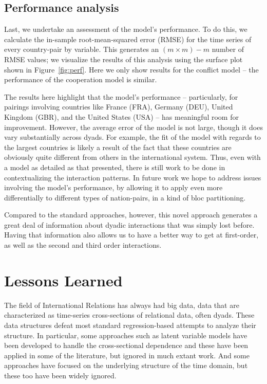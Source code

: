 \documentclass[3p,times,twocolumn,authoryear,12pt]{elsarticle}
\begin{document}
\subsection{Performance analysis}

Last, we undertake an assessment of the model's performance. To do this, we calculate the in-sample root-mean-squared error (RMSE) for the time series of every country-pair by variable. This generates an $(m \times m) - m$ number of RMSE values; we visualize the results of this analysis using the surface plot shown in Figure~\ref{fig:perf}. Here we only show results for the conflict model -- the performance of the cooperation model is similar. 

The results here highlight that the model's performance -- particularly, for pairings involving countries like France (FRA), Germany (DEU), United Kingdom (GBR), and the United States (USA) -- has meaningful room for improvement.  However, the average error of the model is not large, though it does vary substantially across dyads.  For example, the  fit of the model with regards to the largest countries is likely a result of the fact that these countries are obviously quite different from others in the international system. Thus, even with a model as detailed as that presented, there is still work to be done in contextualizing the interaction patterns. In future work we hope to address issues involving the model's performance, by allowing it to apply even more differentially to different types of nation-pairs, in a kind of bloc partitioning. 

Compared to the standard approaches, however, this novel approach generates a great deal of information about dyadic interactions that was simply lost before. Having that information also allows us to have a better way to get at first-order, as well as the second and third order interactions.

\section{Lessons Learned}

The field of International Relations has always had big data, data that are characterized as time-series cross-sections of relational data, often dyads. These data structures defeat most standard regression-based attempts to analyze their structure. In particular, some approaches such as latent variable models have been developed to handle the cross-sectional dependence and these have been applied in some of the literature, but ignored in much extant work. And some approaches have focused on the underlying structure of the time domain, but these too have been widely ignored. 
\end{document}

